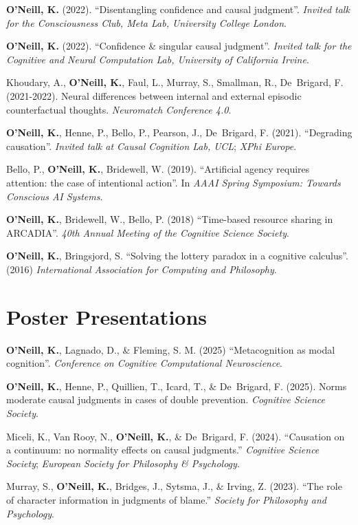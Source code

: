 \textbf{O'Neill, K.} (2022). ``Disentangling confidence and causal
judgment''. \emph{Invited talk for the Consciousness Club, Meta Lab,
University College London}.

\textbf{O'Neill, K.} (2022). ``Confidence \& singular causal
judgment''. \emph{Invited talk for the Cognitive and Neural
Computation Lab, University of California Irvine}.

Khoudary, A., \textbf{O’Neill, K.}, Faul, L., Murray, S., Smallman,
R., De~Brigard, F. (2021-2022). Neural differences between internal
and external episodic counterfactual thoughts. \emph{Neuromatch
Conference 4.0}.

\textbf{O'Neill, K.}, Henne, P., Bello, P., Pearson, J., De~Brigard,
F. (2021). ``Degrading causation''. \emph{Invited talk at Causal
Cognition Lab, UCL}; \emph{XPhi Europe}.

Bello, P., \textbf{O'Neill, K.}, Bridewell, W. (2019). ``Artificial
agency requires attention: the case of intentional action''. In
\emph{AAAI Spring Symposium: Towards Conscious AI Systems}.

\textbf{O'Neill, K.}, Bridewell, W., Bello, P. (2018) ``Time-based
resource sharing in ARCADIA''. \emph{40th Annual Meeting of the
Cognitive Science Society}.

\textbf{O’Neill, K.}, Bringsjord, S. ``Solving the lottery paradox in
a cognitive calculus''. (2016) \emph{International Association for
Computing and Philosophy}.


\line\section{Poster Presentations}

\textbf{O'Neill, K.}, Lagnado, D., \& Fleming, S. M. (2025)
``Metacognition as modal cognition''. \emph{Conference on Cognitive
Computational Neuroscience}.

\textbf{O'Neill, K.}, Henne, P., Quillien, T., Icard, T., \&
De~Brigard, F. (2025). Norms moderate causal judgments in cases of
double prevention. \emph{Cognitive Science Society}.

Miceli, K., Van Rooy, N., \textbf{O'Neill, K.}, \& De~Brigard,
F. (2024). ``Causation on a continuum: no normality effects on causal
judgments.'' \emph{Cognitive Science Society}; \emph{European Society
for Philosophy \& Psychology}.

Murray, S., \textbf{O’Neill, K.}, Bridges, J., Sytsma, J., \& Irving,
Z. (2023). ``The role of character information in judgments of
blame.'' \emph{Society for Philosophy and Psychology}.

